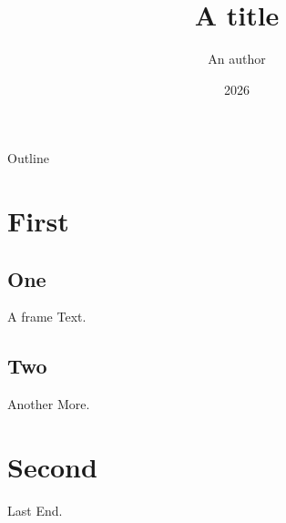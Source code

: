 \documentclass{beamer}
\title{A title}
\author{An author}
\institute{A place}
\date{2026}
\begin{document}
\begin{frame}
\titlepage
\end{frame}
\begin{frame}{Outline}
\tableofcontents
\end{frame}
\section{First}
\subsection{One}
\begin{frame}{A frame}
Text.
\end{frame}
\subsection{Two}
\begin{frame}{Another}
More.
\end{frame}
\section{Second}
\begin{frame}{Last}
End.
\end{frame}
\end{document}
